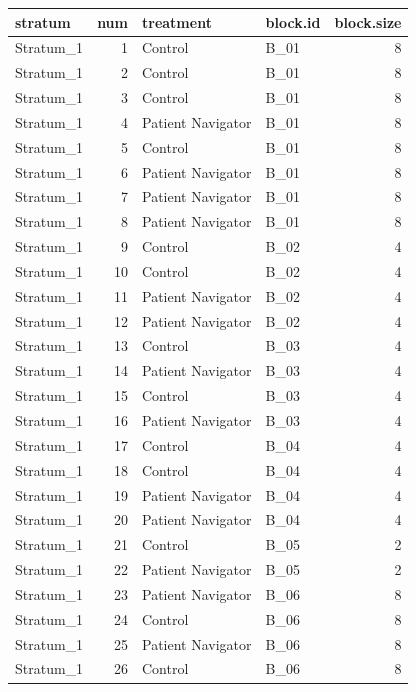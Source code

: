 \documentclass[
]{book}
\begin{document}
\begin{table}[H]
\centering
\begin{tabular}{l|r|l|l|r}
\hline
stratum & num & treatment & block.id & block.size\\
\hline
Stratum\_1 & 1 & Control & B\_01 & 8\\
\hline
Stratum\_1 & 2 & Control & B\_01 & 8\\
\hline
Stratum\_1 & 3 & Control & B\_01 & 8\\
\hline
Stratum\_1 & 4 & Patient Navigator & B\_01 & 8\\
\hline
Stratum\_1 & 5 & Control & B\_01 & 8\\
\hline
Stratum\_1 & 6 & Patient Navigator & B\_01 & 8\\
\hline
Stratum\_1 & 7 & Patient Navigator & B\_01 & 8\\
\hline
Stratum\_1 & 8 & Patient Navigator & B\_01 & 8\\
\hline
Stratum\_1 & 9 & Control & B\_02 & 4\\
\hline
Stratum\_1 & 10 & Control & B\_02 & 4\\
\hline
Stratum\_1 & 11 & Patient Navigator & B\_02 & 4\\
\hline
Stratum\_1 & 12 & Patient Navigator & B\_02 & 4\\
\hline
Stratum\_1 & 13 & Control & B\_03 & 4\\
\hline
Stratum\_1 & 14 & Patient Navigator & B\_03 & 4\\
\hline
Stratum\_1 & 15 & Control & B\_03 & 4\\
\hline
Stratum\_1 & 16 & Patient Navigator & B\_03 & 4\\
\hline
Stratum\_1 & 17 & Control & B\_04 & 4\\
\hline
Stratum\_1 & 18 & Control & B\_04 & 4\\
\hline
Stratum\_1 & 19 & Patient Navigator & B\_04 & 4\\
\hline
Stratum\_1 & 20 & Patient Navigator & B\_04 & 4\\
\hline
Stratum\_1 & 21 & Control & B\_05 & 2\\
\hline
Stratum\_1 & 22 & Patient Navigator & B\_05 & 2\\
\hline
Stratum\_1 & 23 & Patient Navigator & B\_06 & 8\\
\hline
Stratum\_1 & 24 & Control & B\_06 & 8\\
\hline
Stratum\_1 & 25 & Patient Navigator & B\_06 & 8\\
\hline
Stratum\_1 & 26 & Control & B\_06 & 8\\

\end{tabular}
\end{table}
\end{document}

